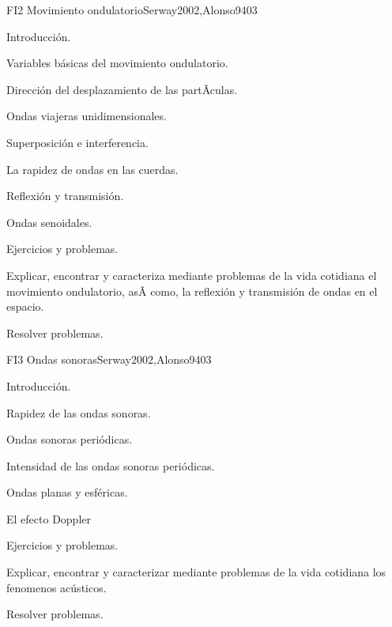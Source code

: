 \begin{syllabus}
\begin{unit}{FI2 Movimiento ondulatorio}{Serway2002,Alonso94}{0}{3}
\begin{topics}
      \item Introducción.
        \item Variables básicas del movimiento ondulatorio.
        \item Dirección del desplazamiento de las partÃ­culas.
        \item Ondas viajeras unidimensionales.
        \item Superposición e interferencia.
        \item La rapidez de ondas en las cuerdas.
        \item Reflexión y transmisión.
        \item Ondas senoidales.
        \item Ejercicios y problemas.
   \end{topics}
   \begin{unitgoals}
      \item Explicar, encontrar y caracteriza mediante problemas de la vida cotidiana el movimiento ondulatorio, asÃ­ como, la reflexión y transmisión de ondas en el espacio.
      \item Resolver problemas.
   \end{unitgoals}
\end{unit}

\begin{unit}{FI3 Ondas sonoras}{Serway2002,Alonso94}{0}{3}
\begin{topics}
      \item  Introducción.
        \item Rapidez de las ondas sonoras.
        \item Ondas sonoras periódicas.
        \item Intensidad de las ondas sonoras periódicas.
        \item Ondas planas y esféricas.
        \item El efecto Doppler
        \item Ejercicios y problemas.
   \end{topics}
   \begin{unitgoals}
      \item Explicar, encontrar y caracterizar mediante problemas de la vida cotidiana los fenomenos acústicos.
      \item Resolver problemas.
   \end{unitgoals}
\end{unit}


\end{syllabus}
